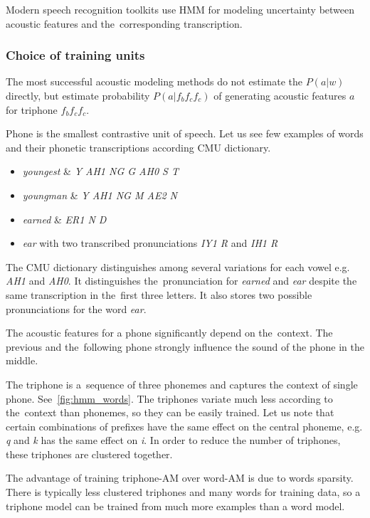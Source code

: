 {Modern speech recognition toolkits use \acl{HMM}
for modeling uncertainty between acoustic features and the~corresponding transcription. 

\subsubsection*{Choice of training units}
The most successful acoustic modeling methods do not estimate the $P(a|w)$ directly,
but estimate probability $P(a|f_{b}f_{c}f_{c})$ of generating acoustic features $a$ for triphone $f_{b}f_{c}f_{c}$.

Phone is the smallest contrastive unit of speech. 
Let us see few examples of words and their phonetic transcriptions according CMU dictionary\cite{weide1998cmu}.
\begin{itemize}
    \item {\it youngest} \& {\it  Y AH1 NG G AH0 S T }
    \item {\it youngman} \& {\it  Y AH1 NG M AE2 N }
    \item {\it earned} \& {\it ER1 N D}
    \item {\it ear}\/ with two transcribed pronunciations {\it IY1 R}\/ and {\it IH1 R}
\end{itemize}
The CMU dictionary distinguishes among several variations for each vowel e.g. {\it AH1}\/ and {\it AH0}.
It distinguishes the~pronunciation for {\it earned}\/ and {\it ear}\/
despite the same transcription in the~first three letters.
It also stores two possible pronunciations for the word {\it ear}.

The acoustic features for a phone significantly depend on the~context.
The previous and the~following phone strongly influence the sound of the phone in the middle.

The triphone is a~sequence of three phonemes and captures the context of single phone.
See~\ref{fig:hmm_words}.
The triphones variate much less according to the~context than phonemes, so they can be easily trained.
Let us note that certain combinations of prefixes have the same effect on the central phoneme,
e.g. {\it q}\/ and {\it k}\/ has the same effect on {\it i}. %
In order to reduce the number of triphones, these triphones are clustered together.

The advantage of training triphone-\ac{AM} over word-\ac{AM} 
is due to words sparsity. 
There is typically less clustered triphones and many words for training data,
so a triphone model can be trained from much more examples than a word model. 

}
